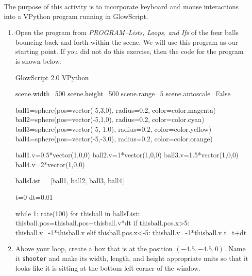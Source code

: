 
\apparatus
{}

\longgoal

The purpose of this activity is to incorporate keyboard and mouse interactions into a VPython program running in GlowScript.

\procedure

\begin{enumerate}

	\subsection*{Using the keyboard to set the velocity of an object}

	\item Open the program from \emph{PROGRAM--Lists, Loops, and Ifs} of the four balls bouncing back and forth within the scene. We will use this program as our starting point. If you did not do this exercise, then the code for the program is shown below.
	
\begin{myvpython}
GlowScript 2.0 VPython

scene.width=500
scene.height=500
scene.range=5
scene.autoscale=False

ball1=sphere(pos=vector(-5,3,0), radius=0.2, color=color.magenta)
ball2=sphere(pos=vector(-5,1,0), radius=0.2, color=color.cyan)
ball3=sphere(pos=vector(-5,-1,0), radius=0.2, color=color.yellow)
ball4=sphere(pos=vector(-5,-3,0), radius=0.2, color=color.orange)

ball1.v=0.5*vector(1,0,0)
ball2.v=1*vector(1,0,0)
ball3.v=1.5*vector(1,0,0)
ball4.v=2*vector(1,0,0)

ballsList = [ball1, ball2, ball3, ball4]

t=0
dt=0.01

while 1:
    rate(100)
    for thisball in ballsList:
        thisball.pos=thisball.pos+thisball.v*dt
        if thisball.pos.x>5:
            thisball.v=-1*thisball.v
        elif thisball.pos.x<-5:
            thisball.v=-1*thisball.v
    t=t+dt
\end{myvpython}

	\item Above your  loop, create a box that is at the position $(-4.5, -4.5, 0)$. Name it \texttt{shooter} and make its width, length, and height appropriate units so that it looks like it is sitting at the bottom left corner of the window.
	

\end{enumerate}
